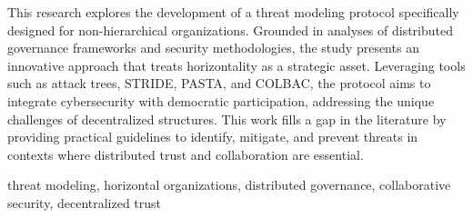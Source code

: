 
%

This research explores the development of a threat modeling protocol
specifically designed for non-hierarchical organizations. Grounded in analyses
of distributed governance frameworks and security methodologies, the study
presents an innovative approach that treats horizontality as a strategic asset.
Leveraging tools such as attack trees, STRIDE, PASTA, and COLBAC, the protocol
aims to integrate cybersecurity with democratic participation, addressing the
unique challenges of decentralized structures. This work fills a gap in the
literature by providing practical guidelines to identify, mitigate, and prevent
threats in contexts where distributed trust and collaboration are essential.

\begin{keywords}
  threat modeling, horizontal organizations, distributed governance, collaborative security, decentralized trust
\end{keywords}
  